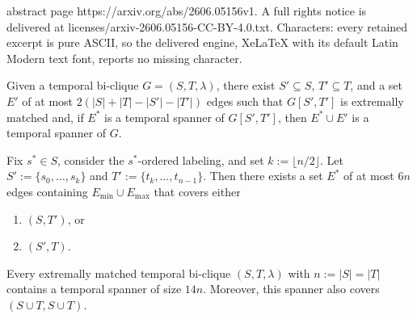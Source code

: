 \documentclass[10pt,a4paper]{amsart}
\newcommand{\maxedges}{E_{\mathrm{max}}}
\newcommand{\minedges}{E_{\mathrm{min}}}
\begin{document}
abstract page https://arxiv.org/abs/2606.05156v1. A full rights notice is delivered at licenses/arxiv-2606.05156-CC-BY-4.0.txt. Characters: every retained excerpt is pure ASCII, so the delivered engine, XeLaTeX with its default Latin Modern text font, reports no missing character.
\begin{lemma}[Dismountability]
\label{lem:dismountable}
Given a temporal bi-clique $G=(S,T,\lambda)$, there exist $S'\subseteq S$, $T'\subseteq T$, and a set $E'$ of at most $2(|S|+|T|-|S'|-|T'|)$ edges such that $G[S',T']$ is extremally matched and, if $E^*$ is a temporal spanner of $G[S',T']$, then $E^*\cup E'$ is a temporal spanner of $G$.
\end{lemma}

\begin{lemma}
\label{lem:final}
Fix $s^*\in S$, consider the $s^*$-ordered labeling, and set $k:=\lfloor n/2 \rfloor$.
Let $S':=\{s_0, \dots, s_k\}$ and $T':=\{t_k, \dots, t_{n-1}\}$.
Then there exists a set $E^*$ of at most $6n$ edges containing $\minedges \cup \maxedges$ that covers either
\begin{enumerate}[label=(\roman*)]
  \item \label{lem:final_cond_source} $(S,T')$, or
  \item \label{lem:final_cond_target} $(S',T)$.
\end{enumerate}
\end{lemma}

\begin{theorem}
\label{thm:mainthm_bicliques_stronger}
Every extremally matched temporal bi-clique $(S,T,\lambda)$ with $n:=|S|=|T|$ contains a temporal spanner of size $14n$.
Moreover, this spanner also covers $(S\cup T, S\cup T)$.
\end{theorem}
\end{document}
